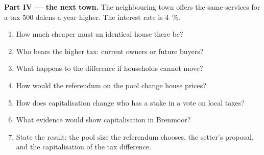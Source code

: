 \begin{problem}
\medskip\noindent\textbf{Part IV --- the next town.} The neighbouring town offers the
same services for a tax 500 dalens a year higher. The interest rate is 4~\%.
\begin{enumerate}[resume]
\item How much cheaper must an identical house there be?
\item Who bears the higher tax: current owners or future buyers?
\item What happens to the difference if households cannot move?
\item How would the referendum on the pool change house prices?
\item How does capitalisation change who has a stake in a vote on local taxes?
\item What evidence would show capitalisation in Brenmoor?
\item State the result: the pool size the referendum chooses, the setter's proposal,
and the capitalisation of the tax difference.
\end{enumerate}
\end{problem}
